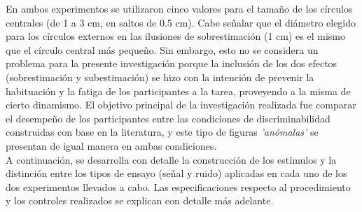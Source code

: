 En ambos experimentos se utilizaron cinco valores para el tamaño de los círculos centrales (de 1 a 3 cm, en saltos de 0.5 cm). Cabe señalar que el diámetro elegido para los círculos externos en las ilusiones de sobrestimación (1 cm) es el mismo que el círculo central más pequeño. Sin embargo, esto no se considera un problema para la presente investigación porque la inclusión de los dos efectos (sobrestimación y subestimación) se hizo con la intención de prevenir la habituación y la fatiga de los participantes a la tarea, proveyendo a la misma de cierto dinamismo. El objetivo principal de la investigación realizada fue comparar el desempeño de los participantes entre las condiciones de discriminabilidad construidas con base en la literatura, y este tipo de figuras \textit{'anómalas'} se presentan de igual manera en ambas condiciones.\\

A continuación, se desarrolla con detalle la construcción de los estímulos y la distinción entre los tipos de ensayo (señal y ruido) aplicadas en cada uno de los dos experimentos llevados a cabo. Las especificaciones respecto al procedimiento y los controles realizados se explican con detalle más adelante.\\

